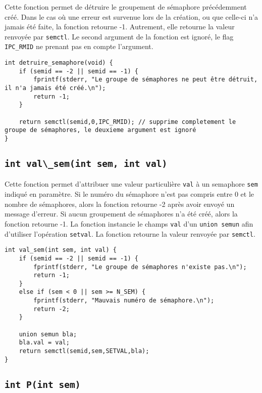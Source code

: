 Cette fonction permet de détruire le groupement de sémaphore précédemment créé. Dans le cas où une erreur est survenue lors de la création, ou que celle-ci n'a jamais été faite, la fonction retourne -1. Autrement, elle retourne la valeur renvoyée par \lstinline{semctl}. Le second argument de la fonction est ignoré, le flag \lstinline{IPC_RMID} ne prenant pas en compte l'argument.

\begin{lstlisting}
int detruire_semaphore(void) {
    if (semid == -2 || semid == -1) {
        fprintf(stderr, "Le groupe de sémaphores ne peut être détruit, il n'a jamais été créé.\n");
        return -1;
    }

    return semctl(semid,0,IPC_RMID); // supprime completement le groupe de sémaphores, le deuxieme argument est ignoré
}
\end{lstlisting}

\subsection{\lstinline{int val\_sem(int sem, int val)}}

Cette fonction permet d'attribuer une valeur particulière \lstinline{val} à un semaphore \lstinline{sem} indiqué en paramètre. Si le numéro du sémaphore n'est pas compris entre 0 et le nombre de sémaphores, alors la fonction retourne -2 après avoir envoyé un message d'erreur. Si aucun groupement de sémaphores n'a été créé, alors la fonction retourne -1. La fonction instancie le champs \lstinline{val} d'un \lstinline{union semun} afin d'utiliser l'opération \lstinline{setval}. La fonction retourne la valeur renvoyée par \lstinline{semctl}.

\begin{lstlisting}
int val_sem(int sem, int val) {
    if (semid == -2 || semid == -1) {
        fprintf(stderr, "Le groupe de sémaphores n'existe pas.\n");
        return -1;
    }
    else if (sem < 0 || sem >= N_SEM) {
        fprintf(stderr, "Mauvais numéro de sémaphore.\n");
        return -2;
    }

    union semun bla;
    bla.val = val;
    return semctl(semid,sem,SETVAL,bla);
}
\end{lstlisting}

\subsection{\lstinline{int P(int sem)}}

